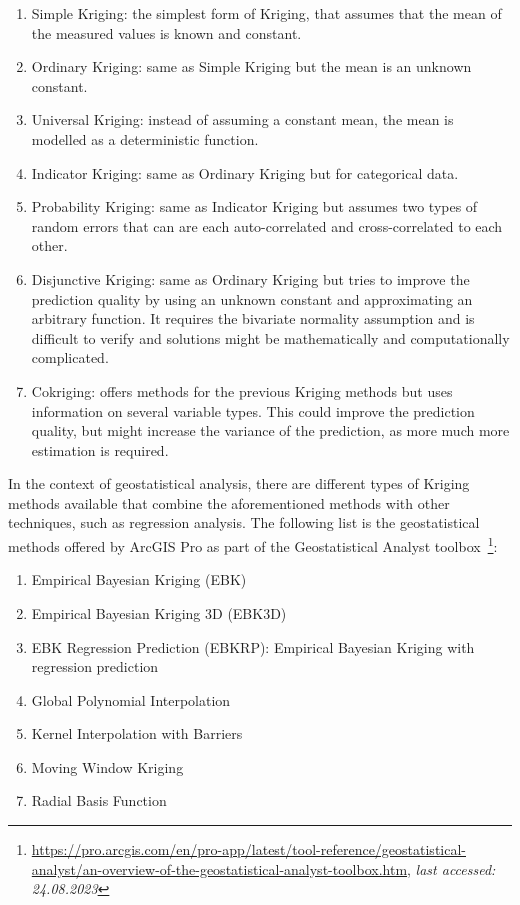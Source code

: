 \begin{enumerate}
    \item Simple Kriging: the simplest form of Kriging, that assumes that the mean of the measured values is known and constant.
    \item Ordinary Kriging: same as Simple Kriging but the mean is an unknown constant.
    \item Universal Kriging: instead of assuming a constant mean, the mean is modelled as a deterministic function.
    \item Indicator Kriging: same as Ordinary Kriging but for categorical data.
    \item Probability Kriging: same as Indicator Kriging but assumes two types of random errors that can are each auto-correlated and cross-correlated to each other.
    \item Disjunctive Kriging: same as Ordinary Kriging but tries to improve the prediction quality by using an unknown constant and approximating an arbitrary function. It requires the bivariate normality assumption and is difficult to verify and solutions might be mathematically and computationally complicated.
    \item Cokriging: offers methods for the previous Kriging methods but uses information on several variable types. This could improve the prediction quality, but might increase the variance of the prediction, as more much more estimation is required.
\end{enumerate}

In the context of geostatistical analysis, there are different types of Kriging methods available that combine the aforementioned methods with other techniques, such as regression analysis. The following list is the geostatistical methods offered by ArcGIS Pro as part of the Geostatistical Analyst toolbox~\footnote{\url{https://pro.arcgis.com/en/pro-app/latest/tool-reference/geostatistical-analyst/an-overview-of-the-geostatistical-analyst-toolbox.htm}, \textit{last accessed: 24.08.2023}}:

\begin{enumerate}
    \item Empirical Bayesian Kriging (EBK)
    \item Empirical Bayesian Kriging 3D (EBK3D)
    \item EBK Regression Prediction (EBKRP): Empirical Bayesian Kriging with regression prediction
    \item Global Polynomial Interpolation
    \item Kernel Interpolation with Barriers
    \item Moving Window Kriging
    \item Radial Basis Function
\end{enumerate}

